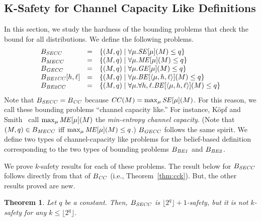 \documentclass{llncs}
\newtheorem{theorem}{Theorem}[section]
\newcommand{\aset}[1]{\{{#1}\}}
\newcommand{\aseq}[1]{\langle#1\rangle}
\begin{document}
\subsection{K-Safety for Channel Capacity Like Definitions}

\label{sec:ksafetycclike}

In this section, we study the hardness of the bounding problems that
check the bound for all distributions.  We define the following problems.
\[
\begin{array}{lcl}
B_{\it SECC}&=&\aset{(M,q)\mid\forall \mu. {\it SE}[\mu](M)\le q}\\
B_{\it MECC}&=&\aset{(M,q)\mid\forall \mu. {\it ME}[\mu](M)\le q}\\
B_{\it GECC}&=&\aset{(M,q)\mid\forall \mu. {\it GE}[\mu](M)\le q} \\
B_{\it BE1CC}[h,\ell]&=&\aset{(M,q)\mid\forall \mu. {\it BE}[\aseq{\mu,h,\ell}](M)\le q} \\
B_{\it BE2CC}&=&\aset{(M,q)\mid\forall \mu.\forall h,\ell. {\it BE}[\aseq{\mu,h,\ell}](M)\le q}
\end{array}
\]
Note that $B_{\it SECC} = B_{\it CC}$ because ${\it CC}(M) = \max_\mu
{\it SE}[\mu](M)$.  For this reason, we call these bounding
problems ``channel capacity like.'' For instance, K{\"o}pf and
Smith~\cite{DBLP:conf/csfw/KopfS10} call $\max_\mu {\it ME}[\mu](M)$
the {\em min-entropy channel capacity}.  (Note that $(M,q) \in B_{\it
  MECC}$ iff $\max_\mu {\it ME}[\mu](M) \leq q$.)  $B_{\it GECC}$
follows the same spirit.  We define two types of channel-capacity like
problems for the belief-based definition corresponding to the two
types of bounding problems $B_{\it BE1}$ and $B_{\it BE2}$.

We prove $k$-safety results for each of these problems.  The result
below for $B_{\it SECC}$ follows directly from that of $B_{\it CC}$
(i.e., Theorem~\ref{thm:cck}).  But, the other results proved are
  new.
\begin{theorem}
\label{thm:secck}
Let $q$ be a constant.  Then, $B_{\it SECC}$ is
$\lfloor2^q\rfloor+1$-safety, but it is not $k$-safety for any $k \leq
\lfloor2^q\rfloor$.
\end{theorem}
\end{document}

